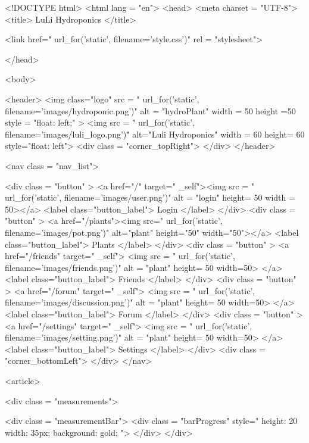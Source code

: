 \documentclass[12pt]{article} %
\begin{document}
\begin{htmlcode}[caption={Plant Page HTML}]
<!DOCTYPE html>
<html lang = "en">
<head>
<meta charset = "UTF-8">
<title> LuLi Hydroponics </title>

<link href="{{ url_for('static', filename='style.css')}}" 
      rel = "stylesheet">


</head>

<body>
 
   <header>
      <img class="logo" src = "{{ url_for('static', filename='images/hydroponic.png')}}" alt = "hydroPlant"  width = 50 height =50 style = "float: left;" >   
      <img src = "{{ url_for('static', filename='images/luli_logo.png')}}" alt="Luli Hydroponics" width = 60 height= 60 style="float: left">
      <div class = "corner_topRight"> </div>
   </header>

   <nav class = "nav_list">
      
      <div class = "button" > 
         <a href="/" target=" _self"><img src = "{{ url_for('static', filename='images/user.png')}}" alt = "login" height= 50 width = 50></a>
         <label class="button_label"> Login </label> 
      </div>
      <div class = "button" > 
         <a href="/plants"><img src="{{ url_for('static', filename='images/pot.png')}}" alt="plant" height="50" width="50"></a>
         <label class="button_label"> Plants </label> 
      </div>
      <div class = "button" > 
         <a href="/friends" target=" _self"> <img src = "{{ url_for('static', filename='images/friends.png')}}" alt = "plant" height= 50 width=50> </a>
         <label class="button_label"> Friends </label> 
      </div>
      <div class = "button" > 
         <a href="/forum" target=" _self"> <img src = "{{ url_for('static', filename='images/discussion.png')}}" alt = "plant" height= 50 width=50> </a>
         <label class="button_label"> Forum </label> 
      </div>
      <div class = "button" > 
         <a href="/settings" target=" _self"> <img src = "{{ url_for('static', filename='images/setting.png')}}" alt = "plant" height= 50 width=50> </a>
         <label class="button_label"> Settings </label> 
      </div>
         <div class = "corner_bottomLeft"> </div>
     </nav>
     
     <article>
      
     <div class = "measurements">

     <div class = "measurementBar"> 
      <div class = "barProgress" style="  
      height: 20%
      width: 35px;
      background: gold; "> 
      </div>
      </div> 


\end{htmlcode}
\end{document}
